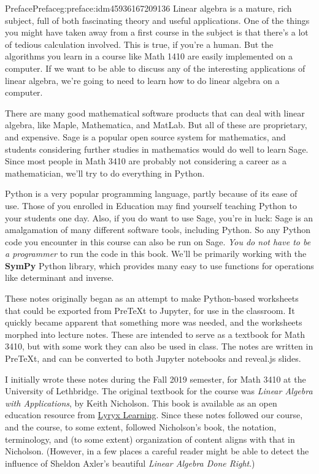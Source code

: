 \documentclass[oneside,10pt,]{book}
\newcommand{\terminology}[1]{\textbf{#1}}
\numberwithin{equation}{section}
\begin{document}
\begin{preface}{Preface}{}{Preface}{}{}{g:preface:idm45936167209136}
Linear algebra is a mature, rich subject, full of both fascinating theory and useful applications. One of the things you might have taken away from a first course in the subject is that there's a lot of tedious calculation involved. This is true, if you're a human. But the algorithms you learn in a course like Math 1410 are easily implemented on a computer. If we want to be able to discuss any of the interesting applications of linear algebra, we're going to need to learn how to do linear algebra on a computer.%
\par
There are many good mathematical software products that can deal with linear algebra, like Maple, Mathematica, and MatLab. But all of these are proprietary, and expensive. Sage is a popular open source system for mathematics, and students considering further studies in mathematics would do well to learn Sage. Since most people in Math 3410 are probably not considering a career as a mathematician, we'll try to do everything in Python.%
\par
Python is a very popular programming language, partly because of its ease of use. Those of you enrolled in Education may find yourself teaching Python to your students one day. Also, if you do want to use Sage, you're in luck: Sage is an amalgamation of many different software tools, including Python. So any Python code you encounter in this course can also be run on Sage. \emph{You do not have to be a programmer} to run the code in this book. We'll be primarily working with the \terminology{SymPy} Python library, which provides many easy to use functions for operations like determinant and inverse.%
\par
These notes originally began as an attempt to make Python-based worksheets that could be exported from PreTeXt to Jupyter, for use in the classroom. It quickly became apparent that something more was needed, and the worksheets morphed into lecture notes. These are intended to serve as a textbook for Math 3410, but with some work they can also be used in class. The notes are written in PreTeXt, and can be converted to both Jupyter notebooks and reveal.js slides.%
\par
I initially wrote these notes during the Fall 2019 semester, for Math 3410 at the University of Lethbridge. The original textbook for the course was \emph{Linear Algebra with Applications}, by Keith Nicholson. This book is available as an open education resource from \href{https://lyryx.com/linear-algebra-applications/}{Lyryx Learning}. Since these notes followed our course, and the course, to some extent, followed Nicholson's book, the notation, terminology, and (to some extent) organization of content aligns with that in Nicholson. (However, in a few places a careful reader might be able to detect the influence of Sheldon Axler's beautiful \emph{Linear Algebra Done Right}.)%
\end{preface}
\end{document}

